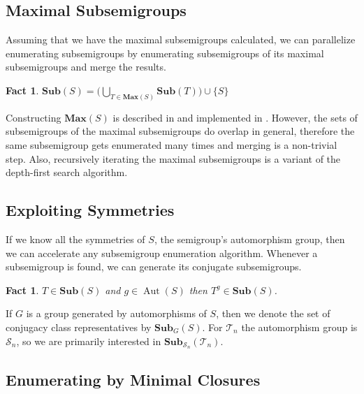 \documentclass{amsart}
\newcommand{\cT}{{\mathcal T}}
\newcommand{\cS}{{\mathcal S}}
\newcommand{\Sub}{\mathbf{Sub}}
\newcommand{\Max}{\mathbf{Max}}
\DeclareMathOperator{\Aut}{Aut}
\theoremstyle{plain}
\newtheorem{fact}[theorem]{Fact}
\theoremstyle{definition}
\begin{document}
\subsection{Maximal Subsemigroups}
Assuming that we have the maximal subsemigroups calculated, we can parallelize enumerating subsemigroups by enumerating subsemigroups of its maximal subsemigroups and merge the results.
\begin{fact}
$\Sub(S)=\big( \bigcup_{T\in \Max(S)}\Sub(T)\big)\cup \{S\}$
\end{fact}
\noindent Constructing $\Max(S)$ is described in \cite{MaxSubSemi} and implemented in \cite{Semigroups}.
However, the sets of subsemigroups of the maximal subsemigroups do overlap in general, therefore the same subsemigroup gets enumerated many times and merging is a non-trivial step.
Also, recursively iterating the maximal subsemigroups is a variant of the depth-first search algorithm.  

\subsection{Exploiting Symmetries}
If we know all the symmetries of $S$, the semigroup's automorphism group, then we can accelerate any subsemigroup enumeration algorithm.
Whenever a subsemigroup is found, we can generate its conjugate subsemigroups.
\begin{fact}
$T\in\Sub(S)$ and $g\in \Aut(S)$ then $T^g\in\Sub(S)$.%
\end{fact}

If $G$ is a group generated by automorphisms of $S$, then we denote the set of conjugacy class representatives by $\Sub_G(S)$. For $\cT_n$ the automorphism group is $\cS_n$, so we are primarily interested in $\Sub_{\cS_n}(\cT_n)$.

\subsection{Enumerating by Minimal Closures}
\end{document}
